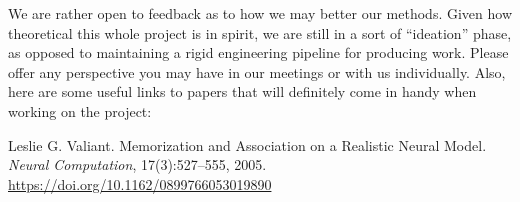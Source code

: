 \documentclass{article}
\begin{document}
\noindent We are rather open to feedback as to how we may better our methods. Given how theoretical this whole project is in spirit, we are still in a sort of ``ideation'' phase, as opposed to maintaining a rigid engineering pipeline for producing work. Please offer any perspective you may have in our meetings or with us individually. Also, here are some useful links to papers that will definitely come in handy when working on the project: \\

\vspace{4mm}

\renewcommand{\section}[2]{}

\begin{thebibliography}{1}
Leslie G. Valiant. Memorization and Association on a Realistic Neural Model. \textit{Neural Computation}, 17(3):527–555, 2005. \url{https://doi.org/10.1162/0899766053019890}
\end{thebibliography}

\vspace{4mm}
\end{document}
